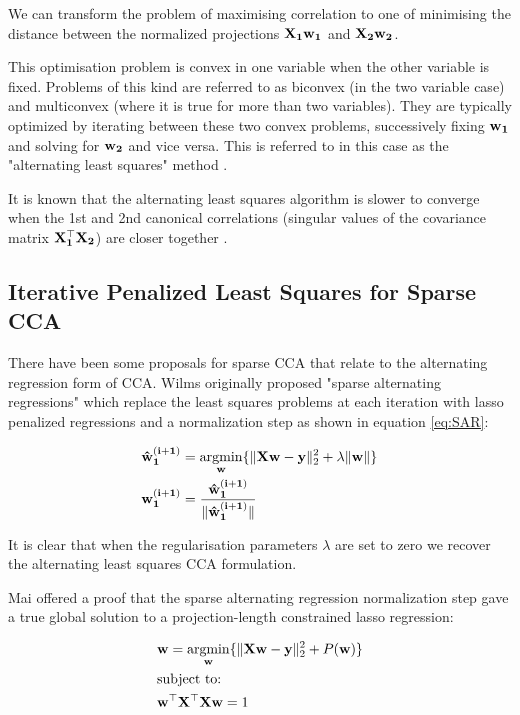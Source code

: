 We can transform the problem of maximising correlation to one of minimising the distance between the normalized projections $\bold{X_1w_1}$ and $\bold{X_2w_2}$.

This optimisation problem is convex in one variable when the other variable is fixed. Problems of this kind are referred to as biconvex (in the two variable case) and multiconvex (where it is true for more than two variables). They are typically optimized by iterating between these two convex problems, successively fixing $\bold{w_1}$ and solving for $\bold{w_2}$ and vice versa. This is referred to in this case as the "alternating least squares" method \cite{lykou2010sparse}. 

It is known that the alternating least squares algorithm is slower to converge when the 1st and 2nd canonical correlations (singular values of the covariance matrix $\bold{X_1^{\top}X_2}$) are closer together \cite{venkatg}.

\subsection{Iterative Penalized Least Squares for Sparse CCA}

There have been some proposals for sparse CCA that relate to the alternating regression form of CCA. Wilms originally proposed "sparse alternating regressions" \cite{wilms2015sparse} which replace the least squares problems at each iteration with lasso penalized regressions and a normalization step as shown in equation \ref{eq:SAR}:

\begin{align}\label{eq:SAR}
    & \bold{\hat{w}^{(i+1)}_1}=\underset{\bold{w}}{\mathrm{argmin}}\{ \|\bold{Xw-y}\|^2_2 + \lambda\|\bold{w}\| \}\\
    & \bold{w^{(i+1)}_1}=\bold{\frac{\hat{w}^{(i+1)}_1}{\|\hat{w}^{(i+1)}_1\|}}
\end{align}

It is clear that when the regularisation parameters $\lambda$ are set to zero we recover the alternating least squares CCA formulation. 

Mai offered a proof that the sparse alternating regression normalization step gave a true global solution to a projection-length constrained lasso regression\cite{mai2019iterative}:

\begin{align}
    & \bold{w}=\underset{\bold{w}}{\mathrm{argmin}}\{ \|\bold{Xw-y}\|^2_2 + P(\bold{w}) \}\\
    & \text{subject to:} \notag\\
    & \bold{w^{\top}X^{\top}Xw}=1 \notag
\end{align}

